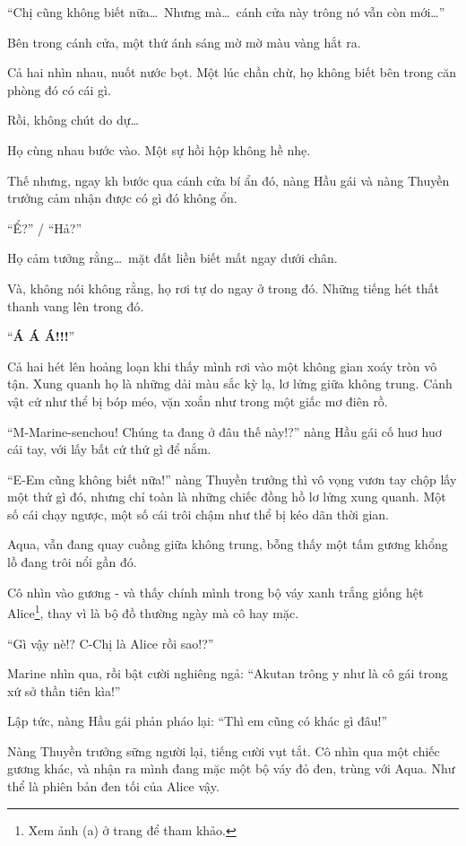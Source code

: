 \documentclass[../main.tex]{subfiles}
\begin{document}
``Chị cũng không biết nữa\dots\ Nhưng mà\dots\ cánh cửa này trông nó vẫn còn mới\dots''

Bên trong cánh cửa, một thứ ánh sáng mờ mờ màu vàng hắt ra.

Cả hai nhìn nhau, nuốt nước bọt. Một lúc chần chừ, họ không biết bên trong căn phòng đó có cái gì.

Rồi, không chút do dự\dots

Họ cùng nhau bước vào. Một sự hồi hộp không hề nhẹ.

Thế nhưng, ngay kh bước qua cánh cửa bí ẩn đó, nàng Hầu gái và nàng Thuyền trưởng cảm nhận được có gì đó không ổn.

``Ể?'' / ``Hả?''

Họ cảm tưởng rằng\dots\ mặt đất liền biết mất ngay dưới chân.

Và, không nói không rằng, họ rơi tự do ngay ở trong đó. Những tiếng hét thất thanh vang lên trong đó.

``\textbf{Á Á Á!!!}''


Cả hai hét lên hoảng loạn khi thấy mình rơi vào một không gian xoáy tròn vô tận. Xung quanh họ là những dải màu sắc kỳ lạ, lơ lửng giữa không trung. Cảnh vật cứ như thể bị bóp méo, vặn xoắn như trong một giấc mơ điên rồ.

``M-Marine-senchou! Chúng ta đang ở đâu thế này!?'' nàng Hầu gái cố huơ huơ cái tay, với lấy bất cứ thứ gì để nắm.

``E-Em cũng không biết nữa!'' nàng Thuyền trưởng thì vô vọng vươn tay chộp lấy một thứ gì đó, nhưng chỉ toàn là những chiếc đồng hồ lơ lửng xung quanh. Một số cái chạy ngược, một số cái trôi chậm như thể bị kéo dãn thời gian.

Aqua, vẫn đang quay cuồng giữa không trung, bỗng thấy một tấm gương khổng lồ đang trôi nổi gần đó.

Cô nhìn vào gương - và thấy chính mình trong bộ váy xanh trắng giống hệt Alice\footnote{Xem ảnh (a) ở trang \pageref{wonderland} để tham khảo.}, thay vì là bộ đồ thường ngày mà cô hay mặc.

``Gì vậy nè!? C-Chị là Alice rồi sao!?''

Marine nhìn qua, rồi bật cười nghiêng ngả: ``Akutan trông y như là cô gái trong xứ sở thần tiên kìa!''

Lập tức, nàng Hầu gái phản pháo lại: ``Thì em cũng có khác gì đâu!''

Nàng Thuyền trưởng sững người lại, tiếng cười vụt tắt. Cô nhìn qua một chiếc gương khác, và nhận ra mình đang mặc một bộ váy đỏ đen, trùng với Aqua. Như thể là phiên bản đen tối của Alice vậy.
\end{document}
